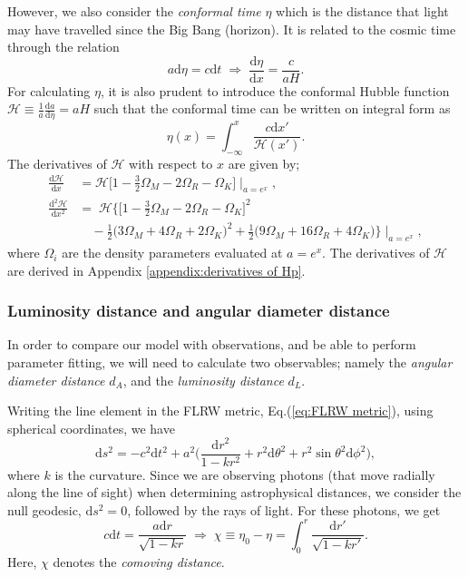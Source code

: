 \documentclass[twocolumn]{aa}
\renewcommand{\d}{\text{d}}
\newcommand{\dd}[2]{\frac{\d #1}{\d #2}}
\begin{document}
However, we also consider the \textit{conformal time} $\eta$ which is the distance that light may have travelled since the Big Bang (horizon). It is related to the cosmic time through the relation
\begin{equation*}
      a\d \eta = c\d t \;\Rightarrow\; \dd{\eta}{x} = \frac{c}{aH}.
\end{equation*}
For calculating $\eta$, it is also prudent to introduce the conformal Hubble function $\mathcal{H}\equiv \frac{1}{a}\dd{a}{\eta}=aH $ such that the conformal time can be written on integral form as
\begin{equation}
      \eta(x) = \int_{-\infty}^{x}\frac{c\d x'}{\mathcal{H}(x')}.\label{eq:eta(x)}
\end{equation}
The derivatives of $\mathcal{H}$ with respect to $x$ are given by;
\begin{align}
      \dd{\mathcal{H}}{x} &= \mathcal{H}\bigg[1- \frac{3}{2}\Omega_{M} -2\Omega_{R} - \Omega_K\bigg] \;\Bigg|_{a = e^x}\;,\label{eq:dHpdx}\\[5mm]
      \dd{^2\mathcal{H}}{x^2} &=\; \mathcal{H}\Bigg\{\bigg[1-\frac{3}{2}\Omega_M -2\Omega_R  -\Omega_K\bigg]^2\label{eq:ddHpddx}\\
      & \quad-\frac{1}{2}\Big(3\Omega_M + 4\Omega_R + 2\Omega_K \Big)^2+\frac{1}{2}\Big(9\Omega_M +16\Omega_R +4\Omega_K\Big)\Bigg\} \;\Bigg|_{a = e^x}\;,\nonumber
\end{align}
where $\Omega_i$ are the density parameters evaluated at $a=e^x$.
The derivatives of $\mathcal{H}$ are derived in Appendix \ref{appendix:derivatives of Hp}.


\subsubsection{Luminosity distance and angular diameter distance}
In order to compare our model with observations, and be able to perform parameter fitting, we will need to calculate two observables; namely the \textit{angular diameter distance} $d_A$, and the \textit{luminosity distance} $d_L$.

Writing the line element in the FLRW metric, Eq.(\ref{eq:FLRW metric}), using spherical coordinates, we have 
\begin{equation}
      \d s^2 = -c^2\d t^2 + a^2\bigg(\frac{\d r^2}{1-kr^2} + r^2\d\theta^2 + r^2\sin\theta^2\d\phi^2\bigg),\label{eq:FLRW in polar coords}
\end{equation}
where $k$ is the curvature. Since we are observing photons (that move radially along the line of sight) when determining astrophysical distances, we consider the null geodesic, $\d s^2=0$, followed by the rays of light. For these photons, we get 
\begin{equation}
      c\d t = \frac{a\d r}{\sqrt{1-kr}}\;\Rightarrow\; \chi \equiv \eta_0-\eta = \int_0^r \frac{\d r'}{\sqrt{1-kr'}}.\label{eq:comoving distance}
\end{equation}
Here, $\chi$ denotes the \textit{comoving distance}. 
\end{document}

